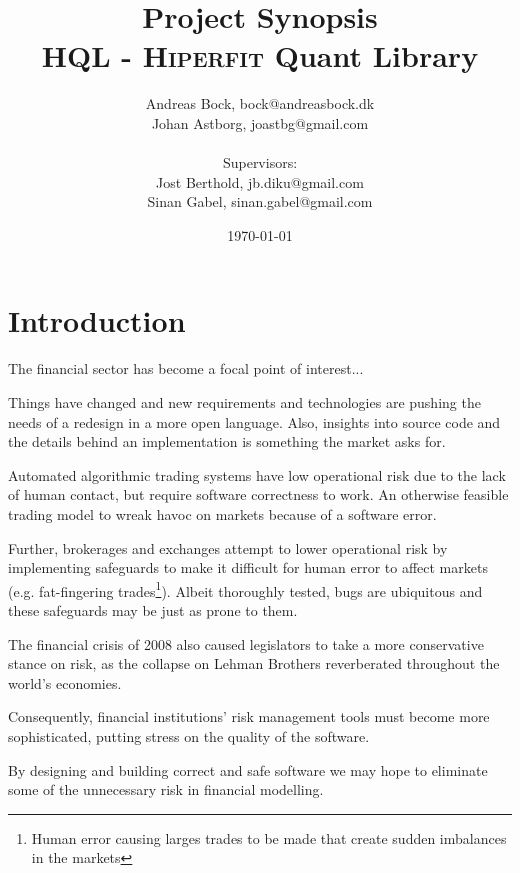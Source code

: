 \documentclass[11pt]{article}
\makeatletter
\def\Author{Andreas Bock, bock@andreasbock.dk\\
Johan Astborg, joastbg@gmail.com\\\\
Supervisors:\\
Jost Berthold, jb.diku@gmail.com\\
Sinan Gabel, sinan.gabel@gmail.com
}
\def\Title{\bf Project Synopsis\\ HQL - \textsc{Hiperfit} Quant Library}
\makeatother
\begin{document}
\title{\Title}
\author{\Author}
\date{\today}
\maketitle

\begin{abstract}


\end{abstract}

\section*{Introduction}

The financial sector has become a focal point of interest...

Things have changed and new requirements and technologies are pushing the needs
of a redesign in a more open language. Also, insights into source code and the
details behind an implementation is something the market asks for.

Automated algorithmic trading systems have low operational risk due to the lack
of human contact, but require software correctness to work. An otherwise feasible
trading model to wreak havoc on markets because of a software error.

Further, brokerages and exchanges attempt to lower operational risk by implementing
safeguards to make it difficult for human error to affect markets (e.g. fat-fingering
trades\footnote{Human error causing larges trades to be made that create sudden imbalances in the markets}). Albeit thoroughly tested, bugs are ubiquitous and
these safeguards may be just as prone to them. 

The financial crisis of 2008 also caused legislators to take a more conservative
stance on risk, as the collapse on Lehman Brothers reverberated throughout
the world's economies.

Consequently, financial institutions' risk management tools must become more
sophisticated, putting stress on the quality of the software.

By designing and building correct and safe software we may hope to eliminate some
of the unnecessary risk in financial modelling.
\end{document}
